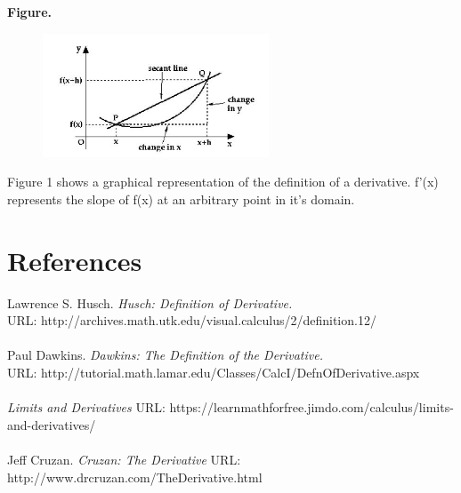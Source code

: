 \documentclass[aps,pra,notitlepage,amsmath,amssymb,letterpaper,12pt]{revtex4-1}
\begin{document}
\noindent \textbf{Figure.}

\begin{figure}[h!]
 \includegraphics[width=0.6\textwidth]{derivativedefinition.JPG}
  \caption{}
  \label{fig:figlabel}
\end{figure}

\noindent Figure 1 shows a graphical representation of the definition of a derivative. f'(x) represents the slope of f(x) at an arbitrary point in it's domain.

\section{References}
\noindent Lawrence S. Husch. \textit{Husch: Definition of Derivative.} \\ URL: http://archives.math.utk.edu/visual.calculus/2/definition.12/
\\
\\
\noindent Paul Dawkins. \textit{Dawkins: The Definition of the Derivative.} \\ URL: http://tutorial.math.lamar.edu/Classes/CalcI/DefnOfDerivative.aspx
\\
\\
\noindent \textit{Limits and Derivatives} URL: https://learnmathforfree.jimdo.com/calculus/limits-and-derivatives/
\\
\\
\noindent Jeff Cruzan. \textit{Cruzan: The Derivative} URL: http://www.drcruzan.com/TheDerivative.html
\end{document}
